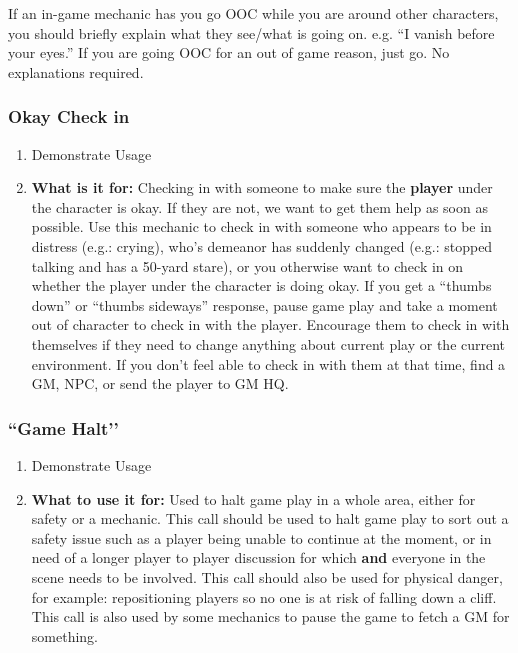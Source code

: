 \documentclass[green]{GL2020}
\begin{document}
If an in-game mechanic has you go OOC while you are around other characters, you should briefly explain what they see/what is going on. e.g. ``I vanish before your eyes.'' If you are going OOC for an out of game reason, just go. No explanations required.

\subsubsection*{Okay Check in}
\begin{enumerate}
	\item Demonstrate Usage
	\item \textbf{What is it for:} Checking in with someone to make sure the \textbf{player} under the character is okay. If they are not, we want to get them help as soon as possible. Use this mechanic to check in with someone who appears to be in distress (e.g.: crying), who’s demeanor has suddenly changed (e.g.: stopped talking and has a 50-yard stare), or you otherwise want to check in on whether the player under the character is doing okay. If you get a ``thumbs down'' or ``thumbs sideways'' response, pause game play and take a moment out of character to check in with the player. Encourage them to check in with themselves if they need to change anything about current play or the current environment. If you don’t feel able to check in with them at that time, find a GM, NPC,  or send the player to GM HQ.
\end{enumerate}

\subsubsection*{``Game Halt’’}
	\begin{enumerate}
		\item Demonstrate Usage
		\item \textbf{What to use it for:} Used to halt game play in a whole area, either for safety or a mechanic. This call should be used to halt game play to sort out a safety issue such as a player being unable to continue at the moment, or in need of a longer player to player discussion for which \textbf{and} everyone in the scene needs to be involved. This call should also be used for physical danger, for example: repositioning players so no one is at risk of falling down a cliff. This call is also used by some mechanics to pause the game to fetch a GM for something.
\end{enumerate}
	
\end{document}
